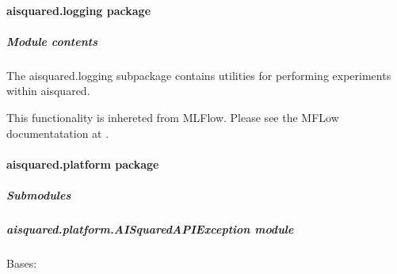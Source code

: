 \documentclass[letterpaper,10pt,english]{sphinxmanual}
\begin{document}
\sphinxstepscope


\paragraph{aisquared.logging package}
\label{\detokenize{aisquared.logging:aisquared-logging-package}}\label{\detokenize{aisquared.logging::doc}}

\subparagraph{Module contents}
\label{\detokenize{aisquared.logging:module-aisquared.logging}}\label{\detokenize{aisquared.logging:module-contents}}
\sphinxAtStartPar
The aisquared.logging subpackage contains utilities for performing experiments within aisquared.

\sphinxAtStartPar
This functionality is inhereted from MLFlow. Please see the MFLow documentatation at .

\sphinxstepscope


\paragraph{aisquared.platform package}
\label{\detokenize{aisquared.platform:aisquared-platform-package}}\label{\detokenize{aisquared.platform::doc}}

\subparagraph{Submodules}
\label{\detokenize{aisquared.platform:submodules}}

\subparagraph{aisquared.platform.AISquaredAPIException module}
\label{\detokenize{aisquared.platform:module-aisquared.platform.AISquaredAPIException}}\label{\detokenize{aisquared.platform:aisquared-platform-aisquaredapiexception-module}}

\begin{fulllineitems}
\label{\detokenize{aisquared.platform:aisquared.platform.AISquaredAPIException.AISquaredAPIException}}
\pysigstartsignatures
{}
\pysigstopsignatures
\sphinxAtStartPar
Bases: 

\end{fulllineitems}
\end{document}
